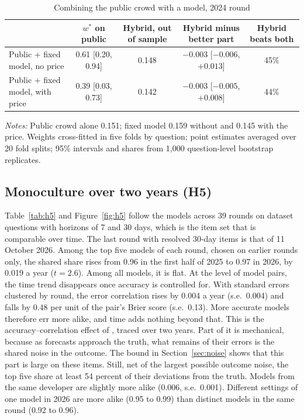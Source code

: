 \documentclass[11pt,a4paper]{article}
\theoremstyle{definition}
\begin{document}
\begin{table}[t]
\centering
\caption{Combining the public crowd with a model, 2024 round}\label{tab:hybrid}
\footnotesize
\begin{threeparttable}
\begin{tabularx}{\textwidth}{L{3.6cm} C C C C}
\toprule
 & $w^*$ on public & Hybrid, out of sample & Hybrid minus better part & Hybrid beats both \\
\midrule
Public + fixed model, no price & 0.61 [0.20, 0.94] & 0.148 & $-0.003$ [$-0.006$, $+0.013$] & 45\% \\
Public + fixed model, with price & 0.39 [0.03, 0.73] & 0.142 & $-0.003$ [$-0.005$, $+0.008$] & 44\% \\
\bottomrule
\end{tabularx}
\begin{tablenotes}\footnotesize
\item \emph{Notes:} Public crowd alone 0.151; fixed model 0.159 without and 0.145 with the price. Weights cross-fitted in five folds by question; point estimates averaged over 20 fold splits; 95\% intervals and shares from 1,000 question-level bootstrap replicates.
\end{tablenotes}
\end{threeparttable}
\end{table}

\subsection{Monoculture over two years (H5)}\label{sec:h5}

Table~\ref{tab:h5} and Figure~\ref{fig:h5} follow the models across 39 rounds on dataset questions with horizons of 7 and 30 days, which is the item set that is comparable over time. The last round with resolved 30-day items is that of 11 October 2026. Among the top five models of each round, chosen on earlier rounds only, the shared share rises from 0.96 in the first half of 2025 to 0.97 in 2026, by 0.019 a year ($t=2.6$). Among all models, it is flat. At the level of model pairs, the time trend disappears once accuracy is controlled for. With standard errors clustered by round, the error correlation rises by 0.004 a year (s.e.\ 0.004) and falls by 0.48 per unit of the pair's Brier score (s.e.\ 0.13). More accurate models therefore err more alike, and time adds nothing beyond that. This is the accuracy--correlation effect of \citet{jeddi2026crowdsourced}, traced over two years. Part of it is mechanical, because as forecasts approach the truth, what remains of their errors is the shared noise in the outcome. The bound in Section~\ref{sec:noise} shows that this part is large on these items. Still, net of the largest possible outcome noise, the top five share at least 54 percent of their deviations from the truth. Models from the same developer are slightly more alike (0.006, s.e.\ 0.001). Different settings of one model in 2026 are more alike (0.95 to 0.99) than distinct models in the same round (0.92 to 0.96).
\end{document}
